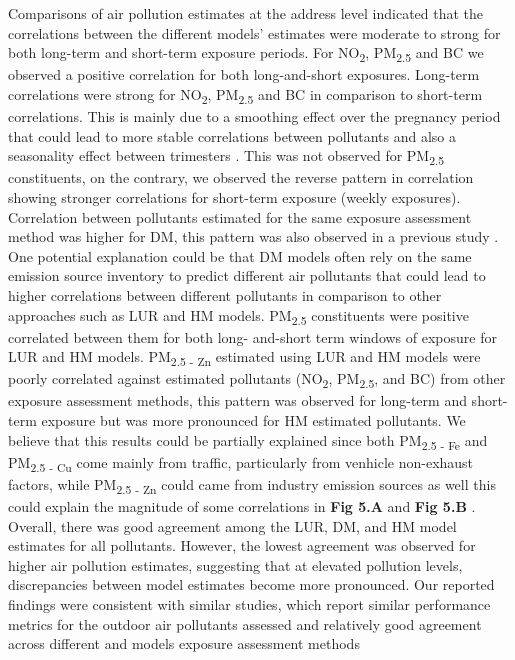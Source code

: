\documentclass{article}
\begin{document}

Comparisons of air pollution estimates at the address level indicated that the correlations between the different models' estimates were moderate to strong for both long-term and short-term exposure periods. For NO\textsubscript{2}, PM\textsubscript{2.5} and BC we observed a positive correlation for both long-and-short exposures. Long-term correlations were strong for NO\textsubscript{2}, PM\textsubscript{2.5} and BC in comparison to short-term correlations. This is mainly due to a smoothing effect over the pregnancy period that could lead to more stable correlations between pollutants and also a seasonality effect between trimesters \cite{wang2018, morgan2023, hao2023}. This was not observed for PM\textsubscript{2.5} constituents, on the contrary, we observed the reverse pattern in correlation showing stronger correlations for short-term exposure (weekly exposures). Correlation between pollutants estimated for the same exposure assessment method was higher for DM, this pattern was also observed in  a previous study \cite{klompmaker2021}. One potential explanation could be that DM models often rely on the same emission source inventory to predict different air pollutants that could lead to higher correlations between different pollutants in comparison to other approaches such as LUR and HM models. PM\textsubscript{2.5} constituents were positive correlated between them for both long- and-short term windows of exposure for LUR and HM models. PM\textsubscript{2.5 - Zn} estimated using LUR and HM models were poorly correlated against estimated pollutants (NO\textsubscript{2}, PM\textsubscript{2.5}, and BC) from other exposure assessment methods, this pattern was observed for long-term and short-term exposure but was more pronounced for HM estimated pollutants. We believe that this results could be partially explained since both PM\textsubscript{2.5 - Fe} and PM\textsubscript{2.5 - Cu} come mainly from traffic, particularly from venhicle non-exhaust factors, while PM\textsubscript{2.5 - Zn} could came from industry emission sources as well this could explain the magnitude of some correlations in \textbf{Fig 5.A} and \textbf{Fig 5.B} \cite{amato2024}. Overall, there was good agreement among the LUR, DM, and HM model estimates for all pollutants. However, the lowest agreement was observed for higher air pollution estimates, suggesting that at elevated pollution levels, discrepancies between model estimates become more pronounced. Our reported findings were consistent with similar studies, which report similar performance metrics for the outdoor air pollutants assessed and relatively good agreement across different \cite{mila2023} and models exposure assessment methods \\ 
\end{document}
